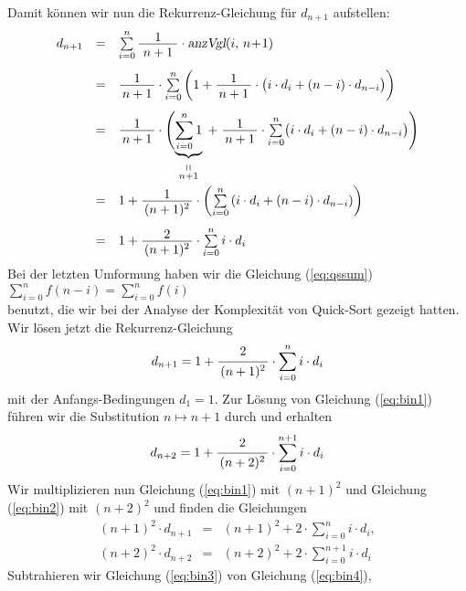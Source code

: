 Damit k\"onnen wir nun die Rekurrenz-Gleichung f\"ur $d_{n+1}$ aufstellen: 
\[
\begin{array}{lcl}
d_{n+1} 
& = &  
\sum\limits_{i=0}^n \bruch{1}{\,n+1\,} \cdot \textsl{anzVgl}(i,\,n\!+\!1)  \\[0.5cm]
& = &  
\bruch{1}{n+1} \cdot \sum\limits_{i=0}^n  
           \left(1 + \bruch{1}{n+1} \cdot \bigl(i \cdot d_i + (n-i) \cdot d_{n-i} \bigr) \right)
\\[0.5cm]
& = &  
\bruch{1}{n+1} \cdot \Biggl(\underbrace{\sum\limits_{i=0}^n 1}_{\stackrel{\displaystyle \shortparallel}{n+1}} \;+\;
           \bruch{1}{n+1} \cdot \sum\limits_{i=0}^n \bigl(i \cdot d_i + (n-i) \cdot d_{n-i} \bigr) \Biggr)
\\[1.3cm]
& = &  
1 + \bruch{1}{(n+1)^2} \cdot \left(\sum\limits_{i=0}^n \left(i\cdot d_i + (n-i)\cdot d_{n-i}\right) \right) 
\\[0.5cm]
& = &  
1 + \bruch{2}{(n+1)^2} \cdot \sum\limits_{i=0}^n i\cdot d_i 
\end{array}
\]
Bei der letzten Umformung haben wir die Gleichung (\ref{eq:qssum}) \\[0.2cm]
\hspace*{1.3cm} $\sum\limits_{i=0}^n f(n-i) = \sum\limits_{i=0}^n f(i)$ \\[0.2cm]
benutzt, die wir bei der Analyse der Komplexit\"at von Quick-Sort gezeigt hatten.
Wir l\"osen jetzt die Rekurrenz-Gleichung 
\begin{equation}
  \label{eq:bin1}
d_{n+1} = \displaystyle 1 + \bruch{2}{(n+1)^2} \cdot \sum\limits_{i=0}^n i\cdot d_i  
\end{equation}
mit der Anfangs-Bedingungen $d_1 = 1$.  
Zur L\"osung von Gleichung (\ref{eq:bin1}) f\"uhren wir die Substitution $n \mapsto n+1$ durch und erhalten 
\begin{equation}
  \label{eq:bin2}
d_{n+2} = \displaystyle 1 + \bruch{2}{(n+2)^2} \cdot \sum\limits_{i=0}^{n+1} i\cdot d_i  
\end{equation}
Wir multiplizieren nun Gleichung (\ref{eq:bin1}) mit $(n+1)^2$ und Gleichung (\ref{eq:bin2}) 
mit $(n+2)^2$ und finden die Gleichungen 
\begin{eqnarray}
  \label{eq:bin3}
(n+1)^2 \cdot d_{n+1} & = & (n+1)^2 + 2 \cdot \sum\limits_{i=0}^n i\cdot d_i, \\
  \label{eq:bin4}
(n+2)^2 \cdot d_{n+2} & = & (n+2)^2 + 2 \cdot \sum\limits_{i=0}^{n+1} i\cdot d_i
\end{eqnarray}
Subtrahieren wir Gleichung (\ref{eq:bin3}) von Gleichung (\ref{eq:bin4}),
